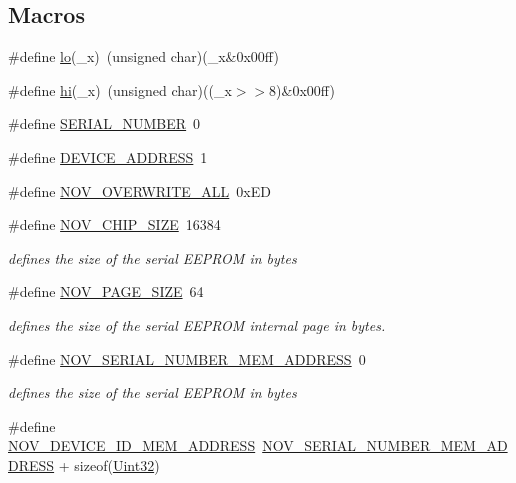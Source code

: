 \subsection*{Macros}
\begin{DoxyCompactItemize}
\item 
\#define \hyperlink{a00029_a5fadc1fcee76b0cab65e127bcd21b314}{lo}(\+\_\+x)~(unsigned char)(\+\_\+x\&0x00ff)
\item 
\#define \hyperlink{a00029_ad27bf81761e0eaf90d05c3eb4d343d5a}{hi}(\+\_\+x)~(unsigned char)((\+\_\+x$>$$>$8)\&0x00ff)
\item 
\#define \hyperlink{a00029_ad8a20d143f6a7579ed227578aeddec21}{S\+E\+R\+I\+A\+L\+\_\+\+N\+U\+M\+B\+E\+R}~0
\item 
\#define \hyperlink{a00029_a457be1c5e5fee67ed7d01f5887c2d656}{D\+E\+V\+I\+C\+E\+\_\+\+A\+D\+D\+R\+E\+S\+S}~1
\item 
\#define \hyperlink{a00029_aa3471d8e4814035dc24211c0890899bb}{N\+O\+V\+\_\+\+O\+V\+E\+R\+W\+R\+I\+T\+E\+\_\+\+A\+L\+L}~0x\+E\+D
\item 
\#define \hyperlink{a00029_acbac04a78072f0322171ea94017f246e}{N\+O\+V\+\_\+\+C\+H\+I\+P\+\_\+\+S\+I\+Z\+E}~16384
\begin{DoxyCompactList}\small\item\em defines the size of the serial E\+E\+P\+R\+O\+M in bytes \end{DoxyCompactList}\item 
\#define \hyperlink{a00029_aad44ced0f63ecf5d2ced5bc0bf220287}{N\+O\+V\+\_\+\+P\+A\+G\+E\+\_\+\+S\+I\+Z\+E}~64
\begin{DoxyCompactList}\small\item\em defines the size of the serial E\+E\+P\+R\+O\+M internal page in bytes. \end{DoxyCompactList}\item 
\#define \hyperlink{a00029_ab7dc1ea8a7f6e16cf27fbfe88efd7285}{N\+O\+V\+\_\+\+S\+E\+R\+I\+A\+L\+\_\+\+N\+U\+M\+B\+E\+R\+\_\+\+M\+E\+M\+\_\+\+A\+D\+D\+R\+E\+S\+S}~0
\begin{DoxyCompactList}\small\item\em defines the size of the serial E\+E\+P\+R\+O\+M in bytes \end{DoxyCompactList}\item 
\#define \hyperlink{a00029_a3ddbe5b40319c96bfe46429e902f8d33}{N\+O\+V\+\_\+\+D\+E\+V\+I\+C\+E\+\_\+\+I\+D\+\_\+\+M\+E\+M\+\_\+\+A\+D\+D\+R\+E\+S\+S}~\hyperlink{a00029_ab7dc1ea8a7f6e16cf27fbfe88efd7285}{N\+O\+V\+\_\+\+S\+E\+R\+I\+A\+L\+\_\+\+N\+U\+M\+B\+E\+R\+\_\+\+M\+E\+M\+\_\+\+A\+D\+D\+R\+E\+S\+S} + sizeof(\hyperlink{a00072_aba99025e657f892beb7ff31cecf64653}{Uint32})
$$
\end{DoxyCompactItemize}
